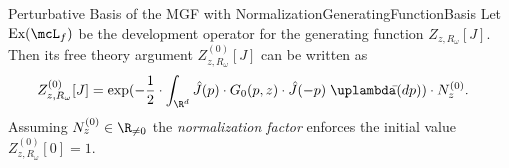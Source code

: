 \begin{mcor}{Perturbative Basis of the MGF with Normalization}{GeneratingFunctionBasis}
    Let $\text{Ex}(\mcL_f)$ be the development operator for the generating function $Z_{z,R_\omega}[J]$. Then its free theory argument $Z_{z,R_\omega}^{(0)}[J]$ can be written as
    \begin{align*}
        Z_{z,R_\omega}^{(0)}[J] &= \exp(
            -\frac{1}{2}\cdot\int_{\R^d} \hat J(p)\cdot G_0(p,z)\cdot\hat J(-p)\;\uplambdabar(dp)
        )\cdot N_z^{(0)}.
    \end{align*}
    Assuming $N_z^{(0)}\in\R_{\neq 0}$ the \emph{normalization factor} enforces the initial value $Z_{z,R_\omega}^{(0)}[0] = 1$.
\end{mcor}